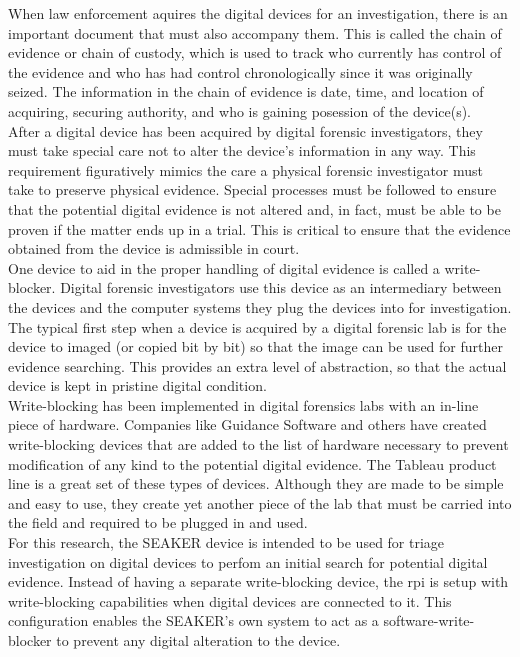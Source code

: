 \documentclass[12pt]{article}
\begin{document}
When law enforcement aquires the digital devices for an investigation, there is
an important document that must also accompany them.  This is called the chain of
evidence or chain of custody, which is used to track who currently has control
of the evidence and
who has had control chronologically since it was originally seized.
The information in the chain
of evidence is date, time, and location of acquiring, securing authority, and who is
gaining posession of the device(s).\\

After a digital device has been acquired by digital forensic investigators, they
must take special care not to alter the device's information in any way.  This 
requirement figuratively mimics the care a physical forensic investigator must
take to preserve physical evidence.  Special processes must be followed to ensure
that the potential digital evidence is not altered and, in fact, must be able to 
be proven if the matter ends up in a trial.  This is critical to ensure that the
evidence obtained from the device is admissible in court.\\

One device to aid in the proper handling of digital evidence is called a
write-blocker.  Digital forensic investigators use this device as an intermediary
between the devices and the computer systems they plug the devices into for
investigation.  The typical first step when a device is acquired by a digital
forensic lab is for the device to imaged (or copied bit by bit) so that the
image can be used for further evidence searching.  This provides an extra level of
abstraction, so that the actual device is kept in pristine digital condition.\\

Write-blocking has been implemented in digital forensics labs with an in-line 
piece of hardware.  Companies like Guidance Software and others have created
write-blocking devices that are added to the list of hardware necessary to 
prevent modification of any kind to the potential digital evidence.  The Tableau
product line is a great set of these types of devices.  Although they are made
to be simple and easy to use, they create yet another piece of the lab that must
be carried into the field and required to be plugged in and used.\\

For this research, the SEAKER device is intended to be used for triage investigation
on digital devices to perfom an initial search for potential digital evidence.
Instead of having a separate write-blocking device, the \gls{rpi} is setup with
write-blocking capabilities when digital devices are connected to it.  This
configuration enables the SEAKER's own system to act as a software-write-blocker
to prevent any digital alteration to the device.\\
\end{document}
